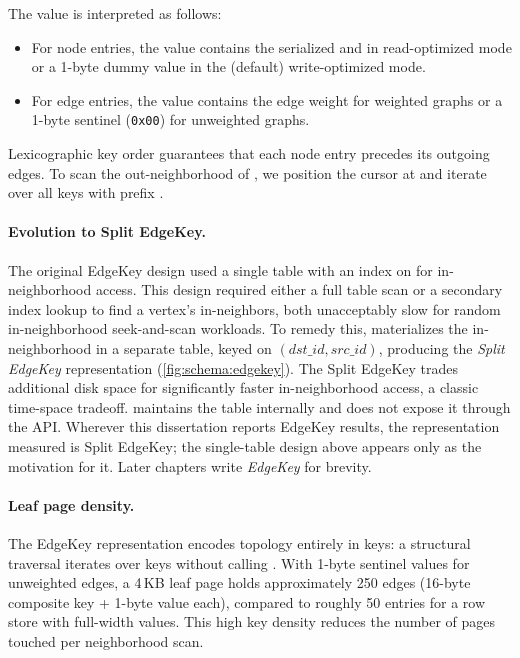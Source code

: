 The value is interpreted as follows:
\begin{itemize}
  \item For node entries, the value contains the serialized  and  in read-optimized mode or a 1-byte dummy value in the (default) write-optimized mode.
  \item For edge entries, the value contains the edge weight for weighted graphs or a 1-byte sentinel (\texttt{0x00}) for unweighted graphs.
\end{itemize}
Lexicographic key order guarantees that each node entry precedes its outgoing edges.
To scan the out-neighborhood of , we position the cursor at  and iterate over all keys with prefix .

\paragraph{Evolution to Split EdgeKey.}
The original EdgeKey design used a single table with an index on  for in-neighborhood access.
This design required either a full table scan or a secondary index lookup to find a vertex's in-neighbors, both unacceptably slow for random in-neighborhood seek-and-scan workloads.
To remedy this, \project{} materializes the in-neighborhood in a separate  table, keyed on $(dst\_id, src\_id)$, producing the \emph{Split EdgeKey} representation (\autoref{fig:schema:edgekey}).
The Split EdgeKey trades additional disk space for significantly faster in-neighborhood access, a classic time-space tradeoff.
\project{} maintains the  table internally and does not expose it through the API.
Wherever this dissertation reports EdgeKey results, the representation measured is Split EdgeKey; the single-table design above appears only as the motivation for it.
Later chapters write \emph{EdgeKey} for brevity.

\paragraph{Leaf page density.}
The EdgeKey representation encodes topology entirely in keys: a structural traversal iterates over keys without calling .
With 1-byte sentinel values for unweighted edges, a 4\,KB leaf page holds approximately 250 edges (16-byte composite key + 1-byte value each), compared to roughly 50 entries for a row store with full-width values.
This high key density reduces the number of pages touched per neighborhood scan.

